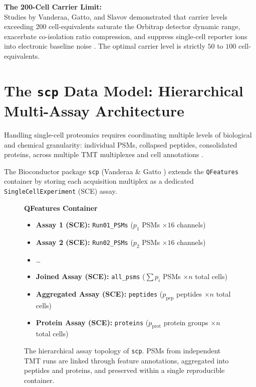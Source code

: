 \documentclass[11pt,twoside,openright]{book}
\begin{document}
\begin{pitfallbox}
\textbf{The 200-Cell Carrier Limit:}\\
Studies by Vanderaa, Gatto, and Slavov demonstrated that carrier levels exceeding 200 cell-equivalents saturate the Orbitrap detector dynamic range, exacerbate co-isolation ratio compression, and suppress single-cell reporter ions into electronic baseline noise \cite{vanderaa2021scp, cheung2021carrier}. The optimal carrier level is strictly $50$ to $100$ cell-equivalents.
\end{pitfallbox}

\section{The \texttt{scp} Data Model: Hierarchical Multi-Assay Architecture}

Handling single-cell proteomics requires coordinating multiple levels of biological and chemical granularity: individual PSMs, collapsed peptides, consolidated proteins, across multiple TMT multiplexes and cell annotations \cite{vanderaa2023scppackage}.

The Bioconductor package \texttt{scp} (Vanderaa \& Gatto \cite{vanderaa2021scp, vanderaa2024using}) extends the \texttt{QFeatures} container \cite{gatto2023qfeatures} by storing each acquisition multiplex as a dedicated \texttt{SingleCellExperiment} (SCE) assay.

\begin{figure}[htbp]
\centering
\begin{tcolorbox}[colback=springerGray,colframe=springerNavy,arc=2mm,boxrule=0.8pt,title={\bfseries The Hierarchical \texttt{scp} Multi-Assay Tree}]
\small
\textbf{QFeatures Container}
\begin{itemize}
    \item \textbf{Assay 1 (SCE):} \texttt{Run01\_PSMs} ($p_1$ PSMs $\times 16$ channels)
    \item \textbf{Assay 2 (SCE):} \texttt{Run02\_PSMs} ($p_2$ PSMs $\times 16$ channels)
    \item \dots
    \item \textbf{Joined Assay (SCE):} \texttt{all\_psms} ($\sum p_i$ PSMs $\times n$ total cells)
    \item \textbf{Aggregated Assay (SCE):} \texttt{peptides} ($p_{\text{pep}}$ peptides $\times n$ total cells)
    \item \textbf{Protein Assay (SCE):} \texttt{proteins} ($p_{\text{prot}}$ protein groups $\times n$ total cells)
\end{itemize}
\end{tcolorbox}
\caption{The hierarchical assay topology of \texttt{scp}. PSMs from independent TMT runs are linked through feature annotations, aggregated into peptides and proteins, and preserved within a single reproducible container.}
\label{fig:scp_tree}
\end{figure}
\end{document}
